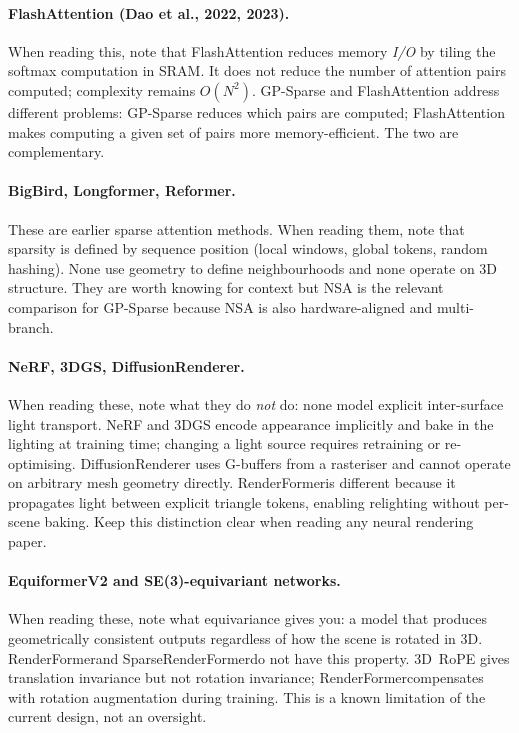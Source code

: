 \documentclass[11pt,letterpaper]{article}
\newcommand{\ours}{SparseRenderFormer}
\newcommand{\RF}{RenderFormer}
\begin{document}
\paragraph{FlashAttention (Dao et al., 2022, 2023).}
When reading this, note that FlashAttention reduces memory \emph{I/O}
by tiling the softmax computation in SRAM.
It does not reduce the number of attention pairs computed; complexity
remains $O(N^2)$.
GP-Sparse and FlashAttention address different problems: GP-Sparse
reduces which pairs are computed; FlashAttention makes computing a
given set of pairs more memory-efficient.
The two are complementary.

\paragraph{BigBird, Longformer, Reformer.}
These are earlier sparse attention methods.
When reading them, note that sparsity is defined by sequence position
(local windows, global tokens, random hashing).
None use geometry to define neighbourhoods and none operate on 3D
structure.
They are worth knowing for context but NSA is the relevant comparison
for GP-Sparse because NSA is also hardware-aligned and multi-branch.

\paragraph{NeRF, 3DGS, DiffusionRenderer.}
When reading these, note what they do \emph{not} do: none model
explicit inter-surface light transport.
NeRF and 3DGS encode appearance implicitly and bake in the lighting
at training time; changing a light source requires retraining or
re-optimising.
DiffusionRenderer uses G-buffers from a rasteriser and cannot operate
on arbitrary mesh geometry directly.
\RF is different because it propagates light between explicit triangle
tokens, enabling relighting without per-scene baking.
Keep this distinction clear when reading any neural rendering paper.

\paragraph{EquiformerV2 and SE(3)-equivariant networks.}
When reading these, note what equivariance gives you: a model that
produces geometrically consistent outputs regardless of how the scene
is rotated in 3D.
\RF and \ours do not have this property.
3D~RoPE gives translation invariance but not rotation invariance;
\RF compensates with rotation augmentation during training.
This is a known limitation of the current design, not an oversight.
\end{document}
